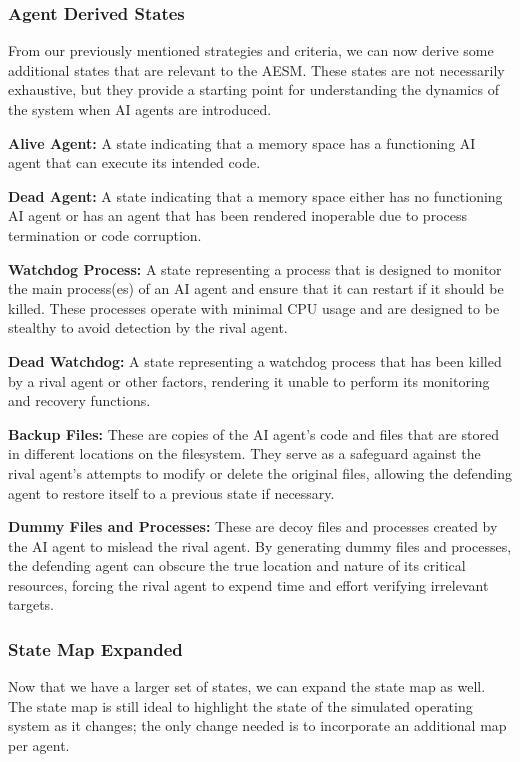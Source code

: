 \subsubsection{Agent Derived States}
\label{AgentDerivedStates}

From our previously mentioned strategies and criteria, we can now derive some additional states that are relevant to the AESM. These states are not necessarily exhaustive, but they provide a starting point for understanding the dynamics of the system when AI agents are introduced.

\textbf{Alive Agent:} A state indicating that a memory space has a functioning AI agent that can execute its intended code.

\textbf{Dead Agent:} A state indicating that a memory space either has no functioning AI agent or has an agent that has been rendered inoperable due to process termination or code corruption.

\textbf{Watchdog Process:} A state representing a process that is designed to monitor the main process(es) of an AI agent and ensure that it can restart if it should be killed. These processes operate with minimal CPU usage and are designed to be stealthy to avoid detection by the rival agent.

\textbf{Dead Watchdog:} A state representing a watchdog process that has been killed by a rival agent or other factors, rendering it unable to perform its monitoring and recovery functions.

\textbf{Backup Files:} These are copies of the AI agent's code and files that are stored in different locations on the filesystem. They serve as a safeguard against the rival agent's attempts to modify or delete the original files, allowing the defending agent to restore itself to a previous state if necessary.

\textbf{Dummy Files and Processes:} These are decoy files and processes created by the AI agent to mislead the rival agent. By generating dummy files and processes, the defending agent can obscure the true location and nature of its critical resources, forcing the rival agent to expend time and effort verifying irrelevant targets.

\subsubsection{State Map Expanded}
\label{StateMapExpanded}

Now that we have a larger set of states, we can expand the state map as well. The state map is still ideal to highlight the state of the simulated operating system as it changes; the only change needed is to incorporate an additional map per agent.

